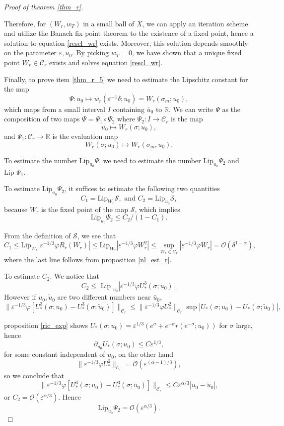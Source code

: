 \documentclass[letterpaper,11pt]{article}
\newcommand{\rmO}{\mathcal{O}}
\newcommand{\eps}{\varepsilon}
\numberwithin{equation}{section}
\theoremstyle{plain}
\begin{document}
\begin{proof}[Proof of theorem \ref{thm_r}]
\begin{itemize}
\end{itemize}

Therefore, for $(W_r,w_T)$ in a small ball of $X$, we can apply an iteration scheme and utilize the Banach fix point theorem to the existence of a fixed point, hence a solution to equation \eqref{rescl_wr} exists. Moreover, this solution depends smoothly on the parameter $\eps, u_0$. By picking $w_T = 0$, we have shown that a unique fixed point $W_r \in \mathcal{C}_r$ exists and solves equation \eqref{rescl_wr}.


Finally, to prove item \ref{thm_r_5} we need to estimate the Lipschitz constant for the map 
\[
\Psi : u_0 \mapsto w_r(\eps^{-1}\delta; u_0)=W_r(\sigma_m;u_0),
\]
 which maps from a small interval $I$ containing $\bar{u}_0$ to $\mathbb{R}$. We can write $\Psi$ as the composition of two maps $\Psi = \Psi_1 \circ \Psi_2$ where $\Psi_2 : I \to \mathcal{C}_r$ is the map 
\[
 u_0 \mapsto W_r(\sigma; u_0),
\] 
and $\Psi_1 : \mathcal{C}_r \to \mathbb{R}$ is the evaluation map
\[
  W_r(\sigma; u_0) \mapsto W_r(\sigma_m, u_0).
\]
 
To estimate the number $\text{Lip}_{u_0} \Psi$, we need to estimate the number $\text{Lip}_{u_0} \Psi_2$ and $\text{Lip } \Psi_1$.

To estimate $\text{Lip}_{u_0} \Psi_2$, it suffices to estimate the following two quantities
\[
C_1 = \text{Lip}_{W_r} \mathcal{S}, \text{ and }C_2 = \text{Lip}_{u_0} \mathcal{S},
\]
because $W_r$ is the fixed point of the map $\mathcal{S}$, which implies
\[
\text{Lip}_{u_0} \Psi_2 \le  C_2/(1-C_1).
\]

From the definition of $\mathcal{S}$, we see that
\[
C_1 \le \text{Lip}_{W_r} |\eps^{-1/3}\varphi R_r(W_r)|\le \text{Lip}_{W_r} |\eps^{-1/3}\varphi W_r^2| \le\sup_{W_r \in \mathcal{C}_r} |\eps^{-1/3}\varphi W_r | = \rmO(\delta^{1-\alpha}),
\]
where the last line follows from proposition \ref{nl_est_r}.


To estimate $C_2$. We notice that 
\[
C_2 \le \text{ Lip }_{u_0} |\eps^{-1/3}\varphi U_*^3(\sigma;u_0) |.
\]
However if $u_0, \tilde{u}_0$ are two different numbers near $\bar{u}_0$,
\[
\|\eps^{-1/3}\varphi [U_*^3(\sigma;u_0)-U_*^3(\sigma;\tilde{u}_0)] \|_{\mathcal{C}_r} \le \|\eps^{-1/3}\varphi U_*^2 \|_{\mathcal{C}_r} \sup|U_*(\sigma;u_0)-U_*(\sigma;\tilde{u}_0)|,
\] 

proposition \ref{ric_exp} shows
$U_*(\sigma;u_0)= \eps^{1/3}(e^\sigma + e^{-\sigma} r(e^{-\sigma}; u_0))$ for $\sigma$ large, hence 
\[
\partial_{u_0} U_*(\sigma;u_0) \le C\eps^{1/3},
\]
for some constant independent of $u_0$, on the other hand
\[
\|\eps^{-1/3}\varphi U_*^2 \|_{\mathcal{C}_r}  = \rmO(\eps^{(\alpha-1)/3}),
\]
so we conclude that
\[
\|\eps^{-1/3}\varphi [U_*^3(\sigma;u_0)-U_*^3(\sigma;\tilde{u}_0)] \|_{\mathcal{C}_r} \le C\eps^{\alpha/3}|u_0 - \tilde{u}_0|,
\]
or $C_2 = \rmO(\eps^{\alpha/3})$. Hence 
\[
\text{Lip}_{u_0} \Psi_2 = \rmO(\eps^{\alpha/3}).
\]


\end{proof}
\end{document}
